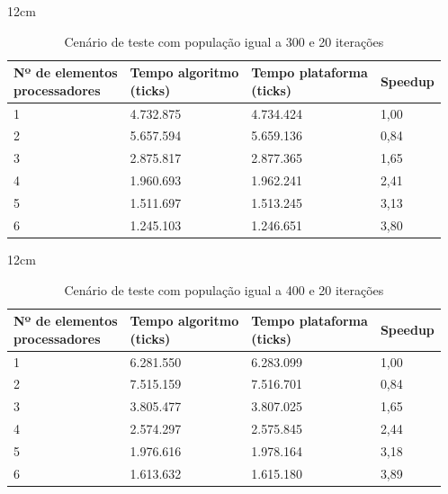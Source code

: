 \begin{table}[h]{12cm}
    \caption{Cenário de teste com população igual a 300 e 20 iterações}
    \label{cenario3}
    \begin{tabular}{llll}
        \hline
        \shortstack[l]{Nº de elementos \\ processadores} & \shortstack[l]{Tempo algoritmo \\ (ticks)} & \shortstack[l]{Tempo plataforma \\ (ticks)} & Speedup \\
        \hline
        1 & 4.732.875 & 4.734.424 & 1,00 \\
        2 & 5.657.594 & 5.659.136 & 0,84 \\
        3 & 2.875.817 & 2.877.365 &	1,65 \\
        4 & 1.960.693 & 1.962.241 & 2,41 \\
        5 & 1.511.697 & 1.513.245 & 3,13 \\
        6 & 1.245.103 & 1.246.651 & 3,80 \\
        \hline
    \end{tabular}
\end{table}

\begin{table}[h]{12cm}
    \caption{Cenário de teste com população igual a 400 e 20 iterações}
    \label{cenario4}
    \begin{tabular}{llll}
        \hline
        \shortstack[l]{Nº de elementos \\ processadores} & \shortstack[l]{Tempo algoritmo \\ (ticks)} & \shortstack[l]{Tempo plataforma \\ (ticks)} & Speedup \\
        \hline
        1 & 6.281.550 & 6.283.099 & 1,00 \\
        2 & 7.515.159 & 7.516.701 & 0,84 \\
        3 & 3.805.477 & 3.807.025 &	1,65 \\
        4 & 2.574.297 & 2.575.845 & 2,44 \\
        5 & 1.976.616 & 1.978.164 & 3,18 \\
        6 & 1.613.632 & 1.615.180 & 3,89 \\
        \hline
    \end{tabular}
\end{table}

